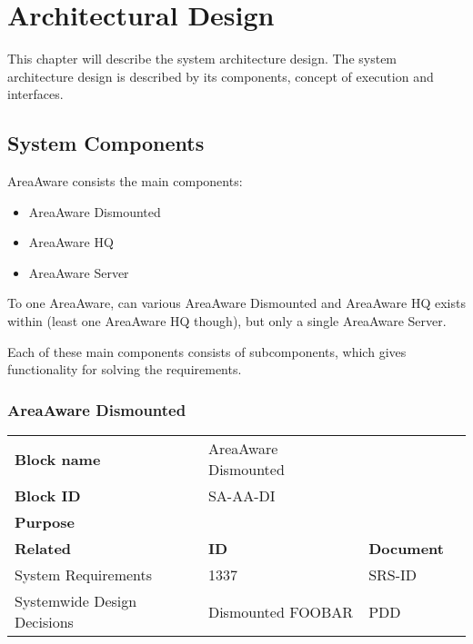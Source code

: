 
\thispagestyle{fancy}
\chapter{Architectural Design}
\label{chp:architectural}

This chapter will describe the system architecture design.
The system architecture design is described by its components, concept of execution and interfaces.


\section{System Components}
AreaAware consists the main components:
\begin{itemize}
\item AreaAware Dismounted
\item AreaAware HQ
\item AreaAware Server
\end{itemize}
To one AreaAware, can various AreaAware Dismounted and AreaAware HQ exists within (least one AreaAware HQ though), but only a single AreaAware Server.



\noindent Each of these main components consists of subcomponents, which gives functionality for solving the requirements. \\


\subsection{AreaAware Dismounted}
\begin{tabular}{l|*{3}{l}}
    \textbf{Block name}     & AreaAware Dismounted \\
    \textbf{Block ID}       & SA-AA-DI & \\
    \textbf{Purpose}        &  \\
    \hline
    \textbf{Related}    & \textbf{ID} & \textbf{Document} \\
    System Requirements & 1337 & SRS-ID \\
    Systemwide Design Decisions & Dismounted FOOBAR & PDD \\
\end{tabular}\\\\

